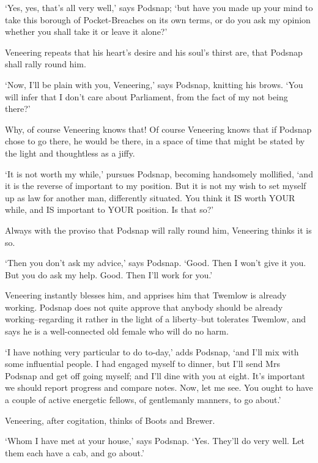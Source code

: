 ‘Yes, yes, that’s all very well,’ says Podsnap; ‘but have you made up
your mind to take this borough of Pocket-Breaches on its own terms, or
do you ask my opinion whether you shall take it or leave it alone?’

Veneering repeats that his heart’s desire and his soul’s thirst are,
that Podsnap shall rally round him.

‘Now, I’ll be plain with you, Veneering,’ says Podsnap, knitting his
brows. ‘You will infer that I don’t care about Parliament, from the fact
of my not being there?’

Why, of course Veneering knows that! Of course Veneering knows that if
Podsnap chose to go there, he would be there, in a space of time that
might be stated by the light and thoughtless as a jiffy.

‘It is not worth my while,’ pursues Podsnap, becoming handsomely
mollified, ‘and it is the reverse of important to my position. But it
is not my wish to set myself up as law for another man, differently
situated. You think it IS worth YOUR while, and IS important to YOUR
position. Is that so?’

Always with the proviso that Podsnap will rally round him, Veneering
thinks it is so.

‘Then you don’t ask my advice,’ says Podsnap. ‘Good. Then I won’t give
it you. But you do ask my help. Good. Then I’ll work for you.’

Veneering instantly blesses him, and apprises him that Twemlow is
already working. Podsnap does not quite approve that anybody should
be already working--regarding it rather in the light of a liberty--but
tolerates Twemlow, and says he is a well-connected old female who will
do no harm.

‘I have nothing very particular to do to-day,’ adds Podsnap, ‘and I’ll
mix with some influential people. I had engaged myself to dinner, but
I’ll send Mrs Podsnap and get off going myself; and I’ll dine with you
at eight. It’s important we should report progress and compare notes.
Now, let me see. You ought to have a couple of active energetic fellows,
of gentlemanly manners, to go about.’

Veneering, after cogitation, thinks of Boots and Brewer.

‘Whom I have met at your house,’ says Podsnap. ‘Yes. They’ll do very
well. Let them each have a cab, and go about.’


